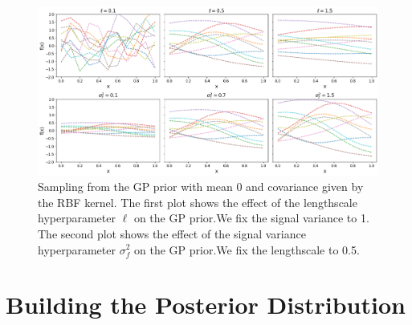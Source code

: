 \documentclass{ucdgradtaughtthesis}
\begin{document}
\begin{figure}[H]
    \centering
        \includegraphics[width=\textwidth]{LatexPlots/1dplots/Kernel_hyperparams.png}
        \caption[Visualising the effect of kernel hyper-parameters.]{Sampling from the GP prior with mean 0 and covariance given by the RBF kernel.
        The first plot shows the effect of the lengthscale hyperparameter \(\ell\) on the GP prior.We fix the signal variance to 1.
        The second plot shows the effect of the signal variance hyperparameter \(\sigma_f^2\) on the GP prior.We fix the lengthscale to 0.5.}
    \label{fig: GPprior_hyperparams}
\end{figure}

\section{Building the Posterior Distribution}
\label{sec: priortoposterior}
\end{document}
